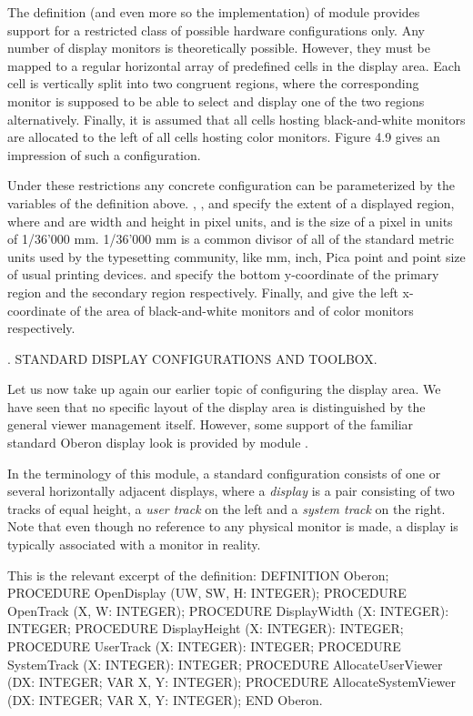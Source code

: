 \noindent The definition (and even more so the implementation) of module 
provides support for a restricted class of possible hardware
configurations only. Any number of display monitors is theoretically
possible. However, they must be mapped to a regular horizontal array
of predefined cells in the display area. Each cell is vertically split
into two congruent regions, where the corresponding monitor is
supposed to be able to select and display one of the two regions
alternatively. Finally, it is assumed that all cells hosting
black-and-white monitors are allocated to the left of all cells
hosting color monitors. Figure 4.9 gives an impression of such a
configuration.

Under these restrictions any concrete configuration can be parameterized by the variables of the definition above. , , and  specify the extent of a displayed region, where  and  are width and height in pixel units, and  is the size of a pixel in units of 1/36’000 mm. 1/36’000 mm is a common divisor of all of the standard metric units used by the typesetting community, like mm, inch, Pica point and point size of usual printing devices.  and  specify the bottom y-coordinate of the primary region and the secondary region respectively. Finally,  and  give the left x-coordinate of the area of black-and-white monitors and of color monitors respectively.


. STANDARD DISPLAY CONFIGURATIONS AND TOOLBOX.

Let us now take up again our earlier topic of configuring the display
area. We have seen that no specific layout of the display area is
distinguished by the general viewer management itself. However, some
support of the familiar standard Oberon display look is provided by
module .

In the terminology of this module, a standard configuration consists
of one or several horizontally adjacent displays, where a \emph{display} is a
pair consisting of two tracks of equal height, a \emph{user track} on the
left and a \emph{system track} on the right. Note that even though no
reference to any physical monitor is made, a display is typically
associated with a monitor in reality.

This is the relevant excerpt of the definition:
\begintt
DEFINITION Oberon;
  PROCEDURE OpenDisplay (UW, SW, H: INTEGER);
  PROCEDURE OpenTrack (X, W: INTEGER);
  PROCEDURE DisplayWidth (X: INTEGER): INTEGER;
  PROCEDURE DisplayHeight (X: INTEGER): INTEGER;
  PROCEDURE UserTrack (X: INTEGER): INTEGER;
  PROCEDURE SystemTrack (X: INTEGER): INTEGER;
  PROCEDURE AllocateUserViewer (DX: INTEGER; VAR X, Y: INTEGER);
  PROCEDURE AllocateSystemViewer (DX: INTEGER; VAR X, Y: INTEGER);
END Oberon.
\endtt


